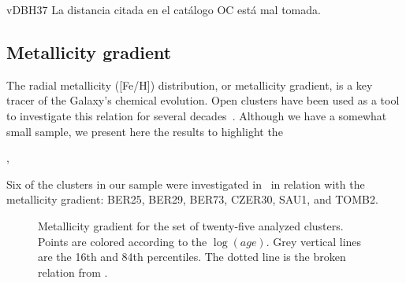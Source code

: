 \documentclass[draft]{aa}
\begin{document}
vDBH37
La distancia citada en el catálogo OC está mal tomada.

 



 \subsection{Metallicity gradient}
  \label{ssec:met_gradient}

  The radial metallicity ([Fe/H]) distribution, or metallicity gradient, is a
  key tracer of the Galaxy's chemical evolution. Open clusters have been used as
  a tool to investigate this relation for several decades~\citep{Janes_1979}.
  Although we have a somewhat small sample, we present here the results to
  highlight the 

  \cite{Donor_2020}, 

  Six of the clusters in our sample were investigated in~\cite{Netopil_2021} in
  relation with the metallicity gradient: BER25, BER29, BER73, CZER30, SAU1,
  and TOMB2.


  \begin{figure}
   \caption{Metallicity gradient for the set of twenty-five analyzed clusters.
   Points are colored according to the $\log(age)$. Grey vertical lines are the
   16th and 84th percentiles. The dotted line is the broken relation from 
   \citet[][Fig 7]{Donor_2020}.}
   \label{fig:met_gradient}
  \end{figure}
\end{document}
